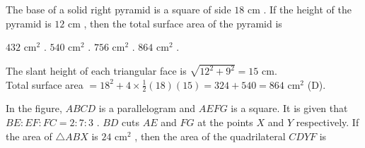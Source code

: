 
\question The base of a solid right pyramid is a square of side $18\text{ cm}$ . If the height of the pyramid is $12\text{ cm}$ , then the total surface area of the pyramid is
\begin{choices}
    \choice $432\text{ cm}^2$ .
    \choice $540\text{ cm}^2$ .
    \choice $756\text{ cm}^2$ .
    \correctchoice $864\text{ cm}^2$ .
\end{choices}
\begin{solution}
The slant height of each triangular face is $\sqrt{12^2 + 9^2} = 15\text{ cm}$. \\
Total surface area $= 18^2 + 4 \times \frac{1}{2}(18)(15) = 324 + 540 = 864\text{ cm}^2$ (D).
\end{solution}

\question In the figure, $ABCD$ is a parallelogram and $AEFG$ is a square. It is given that $BE : EF : FC = 2 : 7 : 3$ . $BD$ cuts $AE$ and $FG$ at the points $X$ and $Y$ respectively. If the area of $\triangle ABX$ is $24\text{ cm}^2$ , then the area of the quadrilateral $CDYF$ is

